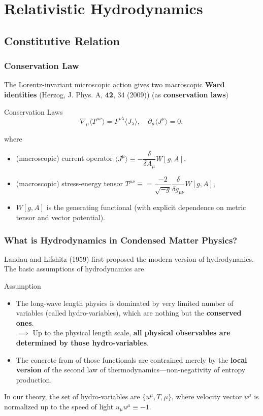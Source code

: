 \documentclass[10pt,aspectratio=43,xcolor=x11names,t]{beamer}%
\begin{document}
\section{Relativistic Hydrodynamics}
	\subsection{Constitutive Relation}		
		\begin{frame}\frametitle{Conservation Law}
			The Lorentz-invariant microscopic action gives two macroscopic \textbf{Ward identities} ({\scriptsize Herzog, J. Phys. A, \textbf{42}, 34 (2009)}) (as \textbf{\color{red}conservation laws})
			\begin{redblock}{Conservation Laws}
				\begin{equation*}
					\nabla_\mu\langle T^{\mu\nu}\rangle=F^{\nu\lambda}\langle J_\lambda\rangle,\quad \partial_\mu\langle J^\mu\rangle=0,
				\end{equation*}
			\end{redblock}
			where
			\begin{itemize}
				\item (macroscopic) current operator $\langle J^\mu\rangle\equiv-\dfrac{\delta}{\delta A_\mu}W[g,A]$,
				\item (macroscopic) stress-energy tensor $T^{\mu\nu}\equiv=\dfrac{-2}{\sqrt{-g}}\dfrac{\delta}{\delta g_{\mu\nu}}W[g,A]$,
				\item $W[g,A]$ is the generating functional (with explicit dependence on metric tensor and vector potential).
			\end{itemize}
		\end{frame}
		
		\begin{frame}\frametitle{What is Hydrodynamics in Condensed Matter Physics?}
			Landau and Lifshitz (1959) first proposed the modern version of hydrodynanics. The basic assumptions of hydrodynamics are
			\begin{greenblock}{Assumption}
				\begin{itemize}
					\item The long-wave length physics is dominated by very limited number of variables (called hydro-variables), which are nothing but the \textbf{conserved ones}.\\
					$\implies$ Up to the physical length scale, \textbf{\color{red}all physical observables are determined by those hydro-variables}.
					\item The concrete from of those functionals are contrained merely by the \textbf{local version} of the second law of thermodynamics---non-negativity of entropy production.
				\end{itemize}
			\end{greenblock}
			\pause
			In our theory, the set of hydro-variables are $\{u^\mu, T, \mu\}$, where velocity vector $u^\mu$ is normalized up to the speed of light $u_\mu u^\mu\equiv-1$.
		\end{frame}
		
\end{document}
